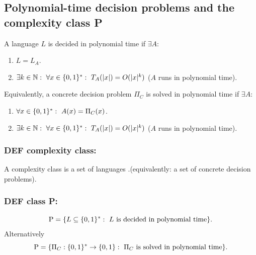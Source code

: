 \subsection{Polynomial-time decision problems and the complexity class P}

\begin{notesdefinition}
A language $L$ is decided in polynomial time if $\exists A$:
\begin{enumerate}
\item $L=L_A$.
\item $\exists k\in\mathbb N:\ \forall x\in\{0,1\}^*:\ T_A(|x|)=O(|x|^k)$ ($A$ runs in polynomial time).
\end{enumerate}
\end{notesdefinition}

\begin{notesdefinition}
Equivalently, a concrete decision problem $\Pi_C$ is solved in polynomial time if $\exists A$:
\begin{enumerate}
\item $\forall x\in\bits^*:\ A(x)=\Pi_C(x)$.
\item $\exists k\in\mathbb N:\ \forall x\in\{0,1\}^*:\ T_A(|x|)=O(|x|^k)$ ($A$ runs in polynomial time).
\end{enumerate}
\end{notesdefinition}

\begin{notesdefinition}
\subsubsection{DEF complexity class:} A complexity class is a set of languages .(equivalently: a set of concrete decision problems).
\end{notesdefinition}

\begin{notesdefinition}
\subsubsection{DEF class P:}
\[
\mathrm{P}=\{L\subseteq\{0,1\}^*:\ L\text{ is decided in polynomial time}\}.
\]
Alternatively 
\[
\mathrm{P}=\{\Pi_C:\{0,1\}^*\to\{0,1\}:\ \Pi_C\text{ is solved in polynomial time}\}.
\]
\end{notesdefinition}

